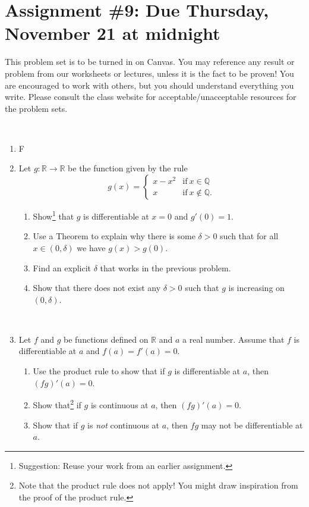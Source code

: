 \documentclass[12pt]{amsart}
\newcommand{\Q}{\mathbb{Q}}
\newcommand{\R}{\mathbb{R}}
\newcommand{\showsol}[1]{\def\displaysol{#1}}
\begin{document}
\showsol{1}
	
	\thispagestyle{empty}
	
	\section*{Assignment \#9: Due Thursday, November 21 at midnight}
	
	This problem set is to be turned in on Canvas. You may reference any result or problem from our worksheets or lectures, unless it is the fact to be proven! You are encouraged to work with others, but you should understand everything you write. Please consult the class website for acceptable/unacceptable resources for the problem sets.
	
	\
	

\begin{enumerate}

\item F

\item Let $g:\R\to \R$ be the function given by the rule
\[ g(x) =  \begin{cases} x- x^2 &\text{if} \ x\in \Q \\ x & \text{if} \ x\notin \Q.\end{cases}\]
\begin{enumerate}
\item Show\footnote{Suggestion: Reuse your work from an earlier assignment.} that $g$ is differentiable at $x=0$ and $g'(0)=1$.
\item Use a Theorem to explain why there is some $\delta>0$ such that for all $x\in (0,\delta)$ we have ${g(x) > g(0)}$.
\item Find an explicit $\delta$ that works in the previous problem.
\item Show that there does not exist any $\delta>0$ such that $g$ is increasing on $(0,\delta)$.
\end{enumerate}

\


\item Let $f$ and $g$ be functions defined on $\R$ and $a$ a real number. Assume that $f$ is differentiable at $a$ and $f(a) = f'(a)=0$.
\begin{enumerate}
\item Use the product rule to show that if $g$ is differentiable at $a$, then  $(fg)'(a)=0$.
\item Show that\footnote{Note that the product rule does not apply! You might draw inspiration from the proof of the product rule.} if $g$ is continuous at $a$, then $(fg)'(a)=0$.
\item Show that if $g$ is \emph{not} continuous at $a$, then $fg$ may not be differentiable at $a$.
\end{enumerate}


\end{enumerate}
\end{document}
